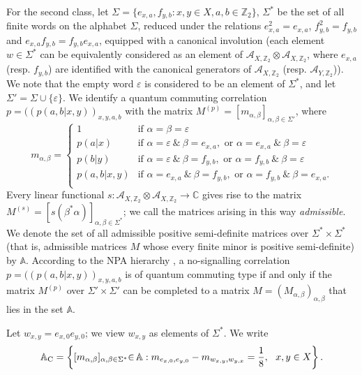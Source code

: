 \documentclass[11pt]{amsart}
\theoremstyle{definition}
\newcommand{\cl}[1]{\mathcal{#1}}
\newcommand{\bb}[1]{\mathbb{#1}}
\begin{document}
For the second class, let $\Sigma = \{e_{x,a}, f_{y,b} : x,y\in X, a,b\in \bb{Z}_2\}$, 
$\Sigma^*$ be the set of all finite words on the alphabet $\Sigma$, reduced 
under the relations $e_{x,a}^2 = e_{x,a}$, $f_{y,b}^2 = f_{y,b}$ and 
$e_{x,a}f_{y,b} = f_{y,b}e_{x,a}$, 
equipped with a canonical involution
(each element $w\in \Sigma^*$ can be equivalently 
considered as an element of 
$\cl A_{X,\bb{Z}_2}\otimes \cl A_{X,\bb{Z}_2}$, 
where $e_{x,a}$ (resp. $f_{y,b}$) are 
identified with the canonical generators of 
$\cl A_{X,\bb{Z}_2}$
(resp. $\cl A_{Y,\bb{Z}_2}$)). 
We note that the empty word $\varepsilon$ is considered to be an element of $\Sigma^*$, and let 
$\Sigma' = \Sigma\cup \{\varepsilon\}$. 
We identify a quantum commuting correlation $p = ((p(a,b|x,y))_{x,y,a,b}$ with the matrix 
$M^{(p)} = [m_{\alpha,\beta}]_{\alpha,\beta\in \Sigma'}$, where 
$$m_{\alpha,\beta} = 
\begin{cases}
1 & \text{if } \alpha = \beta = \varepsilon\\
p(a|x) & \text{if } \alpha = \varepsilon \ \& \ \beta = e_{x,a}, 
\mbox{ or }  \alpha = e_{x,a} \ \& \ \beta = \varepsilon\\
p(b|y) & \text{if } \alpha = \varepsilon \ \& \ \beta = f_{y,b}, 
\mbox{ or }  \alpha = f_{y,b} \ \& \ \beta = \varepsilon\\
p(a,b|x,y) & \text{if } \alpha = e_{x,a} \ \& \ \beta = f_{y,b}, 
\mbox{ or }  \alpha = f_{y,b} \ \& \ \beta = e_{x,a}.\\
\end{cases}
$$
Every linear functional $s : \cl A_{X,\bb{Z}_2}\otimes \cl A_{X,\bb{Z}_2}\to \bb{C}$ gives rise to the 
matrix $M^{(s)} = [s(\beta^*\alpha)]_{\alpha,\beta\in \Sigma^*}$; we call the 
matrices arising in this way \emph{admissible}.
We denote the set of all admissible positive semi-definite matrices over 
$\Sigma^*\times\Sigma^*$ 
(that is, admissible matrices $M$ whose every finite minor is positive semi-definite) by $\bb{A}$. 
According to the NPA hierarchy \cite{npa}, 
a no-signalling correlation $p = ((p(a,b|x,y))_{x,y,a,b}$ is of quantum commuting type 
if and only if the matrix $M^{(p)}$ over $\Sigma'\times \Sigma'$ can be 
completed to a matrix 
$M = (M_{\alpha,\beta})_{\alpha,\beta}$ that lies in the set $\bb{A}$. 

Let $w_{x,y} = e_{x,0}e_{y,0}$; we view $w_{x,y}$ as 
elements of $\Sigma^*$. 
We write 
$$\bb{A}_{\rm C} = \left\{[m_{\alpha,\beta}]_{\alpha,\beta\in \Sigma^*} \hspace{-0.1cm} \in \hspace{-0.04cm}  \bb{A} : 
m_{e_{x,0},e_{y,0}} - m_{w_{x,y},w_{y,x}} = \frac{1}{8}, \ \ x,y\in X\right\}.$$
\end{document}

